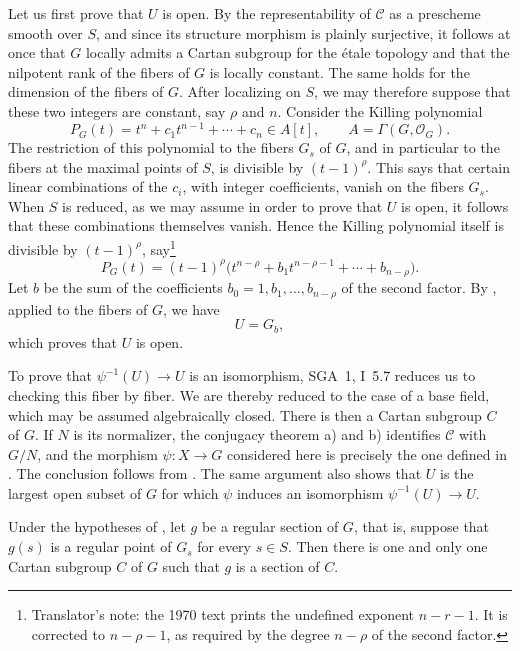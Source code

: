 Let us first prove that \(U\) is open. By the representability of
\(\mathcal C\) as a prescheme smooth over \(S\), and since its
structure morphism is plainly surjective, it follows at once that
\(G\) locally admits a Cartan subgroup for the étale topology and
that the nilpotent rank of the fibers of \(G\) is locally constant.
The same holds for the dimension of the fibers of \(G\). After
localizing on \(S\), we may therefore suppose that these two integers
are constant, say \(\rho\) and \(n\). Consider the Killing polynomial
\[
  P_G(t)=t^n+c_1t^{n-1}+\cdots+c_n\in A[t],
  \qquad A=\Gamma(G,\mathcal O_G).
\]
The restriction of this polynomial to the fibers \(G_s\) of \(G\),
and in particular to the fibers at the maximal points of \(S\), is
divisible by \((t-1)^\rho\). This says that certain linear
combinations of the \(c_i\), with integer coefficients, vanish on the
fibers \(G_s\). When \(S\) is reduced, as we may assume in order to
prove that \(U\) is open, it follows that these combinations
themselves vanish. Hence the Killing polynomial itself is divisible
by \((t-1)^\rho\), say\footnote{Translator's note: the 1970 text prints the undefined
exponent \(n-r-1\). It is corrected to \(n-\rho-1\), as required by
the degree \(n-\rho\) of the second factor.}
\[
  P_G(t)
  =
  (t-1)^\rho
  \bigl(t^{n-\rho}+b_1t^{n-\rho-1}+\cdots+b_{n-\rho}\bigr).
\]
Let \(b\) be the sum of the coefficients
\(b_0=1,b_1,\ldots,b_{n-\rho}\) of the second factor. By , applied
to the fibers of \(G\), we have
\[
  U=G_b,
\]
which proves that \(U\) is open.

To prove that \(\psi^{-1}(U)\to U\) is an isomorphism, SGA~1,
I~5.7 reduces us to checking this fiber by fiber. We are thereby
reduced to the case of a base field, which may be assumed
algebraically closed. There is then a Cartan subgroup \(C\) of \(G\).
If \(N\) is its normalizer, the conjugacy theorem  a) and b)
identifies \(\mathcal C\) with \(G/N\), and the morphism
\(\psi:X\to G\) considered here is precisely the one defined in
. The conclusion follows from . The same argument also
shows that \(U\) is the largest open subset of \(G\) for which
\(\psi\) induces an isomorphism \(\psi^{-1}(U)\to U\).

\begin{corollary}
Under the hypotheses of , let \(g\) be a regular section of \(G\),
that is, suppose that \(g(s)\) is a regular point of \(G_s\) for every
\(s\in S\). Then there is one and only one Cartan subgroup \(C\) of
\(G\) such that \(g\) is a section of \(C\).
\end{corollary}

